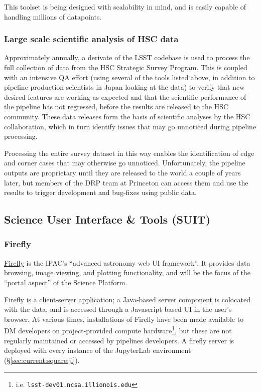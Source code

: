 \documentclass[DM,authoryear,toc,lsstdraft]{lsstdoc}
\begin{document}
This toolset is being designed with scalability in mind, and is easily capable
of handling millions of datapoints.

\subsubsection{Large scale scientific analysis of HSC data}
\label{sec:current:drp:hsc}

Approximately annually, a derivate of the LSST codebase is used to process the
full collection of data from the HSC Strategic Survey Program.  This is
coupled with an intensive QA effort (using several of the tools listed above,
in addition to pipeline production scientists in Japan looking at the data) to
verify that new desired features are working as expected and that the
scientific performance of the pipeline has not regressed, before the results
are released to the HSC community. These data releases form the basis of
scientific analyses by the HSC collaboration, which in turn identify issues
that may go unnoticed during pipeline processing.

Processing the entire survey dataset in this way enables the identification of
edge and corner cases that may otherwise go unnoticed.  Unfortunately, the
pipeline outputs are proprietary until they are released to the world a couple
of years later, but members of the DRP team at Princeton can access them and
use the results to trigger development and bug-fixes using public data.

\subsection{Science User Interface \& Tools (SUIT)}
\label{sec:current:suit}

\subsubsection{Firefly}
\label{sec:current:suit:firefly}

\href{https://github.com/Caltech-IPAC/firefly}{Firefly} is the IPAC's ``advanced
astronomy web UI framework''. It provides data browsing, image viewing, and
plotting functionality, and will be the focus of the ``portal aspect'' of the
Science Platform.

Firefly is a client-server application; a Java-based server component is
colocated with the data, and is accessed through a Javascript based UI in the
user's browser. At various times, installations of Firefly have been made
available to DM developers on project-provided compute hardware\footnote{i.e.
\texttt{lsst-dev01.ncsa.illionois.edu}}, but these are not regularly
maintained or accessed by pipelines developers. A firefly server is deployed
with every instance of the JupyterLab environment (\S\ref{sec:current:square:jl}).
\end{document}
